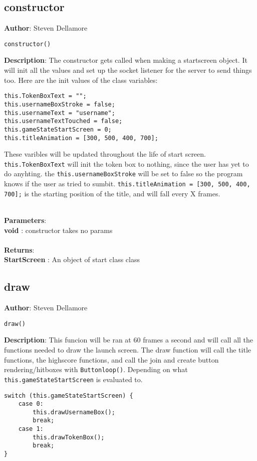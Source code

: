 \documentclass[12pt]{article}
\begin{document}
\subsection{constructor}
\textbf{Author}: Steven Dellamore 
\vspace*{1\baselineskip}
\begin{lstlisting}
constructor()
\end{lstlisting} 
\vspace*{1\baselineskip}
\textbf{Description}: The constructor gets called when making a startscreen object. It will init all the values and set up the socket listener for the server to send things too. Here are the init values of the class variables: 
\begin{verbatim}
this.TokenBoxText = ""; 
this.usernameBoxStroke = false; 
this.usernameText = "username"; 
this.usernameTextTouched = false; 
this.gameStateStartScreen = 0;
this.titleAnimation = [300, 500, 400, 700];
\end{verbatim}
 These varibles will be updated throughout the life of start screen. \texttt{this.TokenBoxText} will init the token box to nothing, since the user has yet to do anyhting. the \texttt{this.usernameBoxStroke} will be set to false so the program knows if the user as tried to sumbit. \texttt{this.titleAnimation = [300, 500, 400, 700];} is the starting position of the title, and will fall every X frames. 


\textbf{\large{\\Parameters}}:\\
\textbf{void }: constructor takes no params\\\textbf{\large{\\Returns}}:\\\textbf{StartScreen }: An object of start class class

\subsection{draw}
\textbf{Author}: Steven Dellamore 
\vspace*{1\baselineskip}
\begin{lstlisting}
draw()
\end{lstlisting} 
\vspace*{1\baselineskip}
\textbf{Description}: This funcion will be ran at 60 frames a second and will call all the functions needed to draw the launch screen. The draw function will call the title functions, the highscore functions, and call the join and create button rendering/hitboxes with \texttt{Buttonloop()}. Depending on what \texttt{this.gameStateStartScreen} is evaluated to. 
\begin{verbatim}
switch (this.gameStateStartScreen) {
	case 0:
		this.drawUsernameBox(); 
		break;
	case 1:
		this.drawTokenBox();
		break;
}
\end{verbatim}
 
\end{document}
